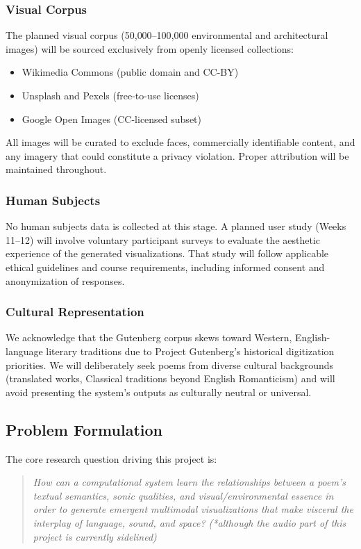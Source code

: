 \documentclass[11pt,a4paper]{article}
\begin{document}
\subsubsection*{Visual Corpus}
The planned visual corpus (50{,}000--100{,}000 environmental and architectural images) will be sourced exclusively from openly licensed collections:
\begin{itemize}
  \item Wikimedia Commons (public domain and CC-BY)
  \item Unsplash and Pexels (free-to-use licenses)
  \item Google Open Images (CC-licensed subset)
\end{itemize}
All images will be curated to exclude faces, commercially identifiable content, and any imagery that could constitute a privacy violation. Proper attribution will be maintained throughout.

\subsubsection*{Human Subjects}
No human subjects data is collected at this stage. A planned user study (Weeks 11--12) will involve voluntary participant surveys to evaluate the aesthetic experience of the generated visualizations. That study will follow applicable ethical guidelines and course requirements, including informed consent and anonymization of responses.

\subsubsection*{Cultural Representation}
We acknowledge that the Gutenberg corpus skews toward Western, English-language literary traditions due to Project Gutenberg's historical digitization priorities. We will deliberately seek poems from diverse cultural backgrounds (translated works, Classical traditions beyond English Romanticism) and will avoid presenting the system's outputs as culturally neutral or universal.

\subsection*{Problem Formulation}

The core research question driving this project is:

\begin{quote}
\textit{How can a computational system learn the relationships between a poem's textual semantics, sonic qualities, and visual/environmental essence in order to generate emergent multimodal visualizations that make visceral the interplay of language, sound, and space? (*although the audio part of this project is currently sidelined)}
\end{quote}
\end{document}
